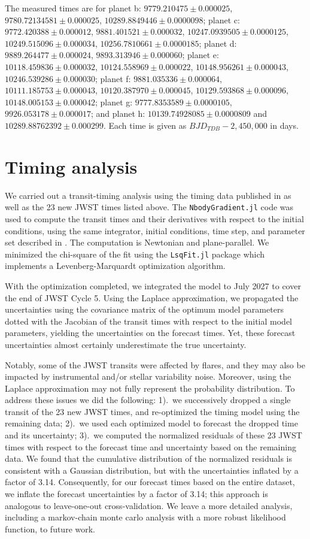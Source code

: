 \documentclass[modern]{aastex631}
\begin{document}
The measured times are for planet b: $9779.210475\pm0.000025$, $9780.72134581\pm 0.000025$, $10289.8849446\pm 0.0000098$;
planet c: $9772.420388\pm 0.000012$, $9881.401521\pm 0.000032$,
$10247.0939505\pm 0.0000125$, $10249.515096\pm 0.000034$, 
$10256.7810661\pm 0.0000185$; planet d: $9889.264477\pm 0.000024$,
$9893.313946\pm 0.000060$;
planet e: $10118.459836\pm 0.000032$, $10124.558969\pm 0.000022$,     
$10148.956261\pm 0.000043$, $10246.539286\pm 0.000030$;
planet f: $9881.035336\pm 0.000064$,
$10111.185753\pm 0.000043$,
$10120.387970\pm 0.000045$,
$10129.593868\pm 0.000096$,
$10148.005153\pm 0.000042$;
planet g:
$9777.8353589\pm 0.0000105$,
$9926.053178\pm 0.000017$; and
planet h: $10139.74928085\pm 0.0000809$ and
$10289.88762392\pm 0.000299$.  Each time is given as $BJD_{TDB}-2,450,000$ in days.

\section{Timing analysis} 

We carried out a transit-timing analysis using the timing data published in
\citet{Agol2021a} as well as the 23 new JWST times listed above. 
The \texttt{NbodyGradient.jl} \citep{Agol2021b} code was used to compute the transit
times and their derivatives with respect to the initial conditions,
using the same integrator, initial conditions, time step, and parameter set described in \citet{Agol2021a}.  The computation
is Newtonian and plane-parallel.  We
minimized the chi-square of the fit using the \texttt{LsqFit.jl} 
package which implements a Levenberg-Marquardt optimization algorithm.

With the optimization completed, we integrated the model to July 2027
to cover the end of JWST Cycle 5.  Using the Laplace approximation, we
propagated the uncertainties using the covariance matrix of the
optimum model parameters dotted with the Jacobian of the transit times
with respect to the initial model parameters, yielding the uncertainties on the forecast times.  Yet, these forecast uncertainties almost certainly underestimate the true uncertainty.

Notably, some of the JWST transits were affected by flares, and they may also be impacted by instrumental and/or stellar variability noise.  Moreover, using the Laplace approximation may not fully represent the probability distribution.  To address these issues we did the following: 1).\ we successively dropped a single transit of the 23 new JWST times, and re-optimized the timing model using the remaining data; 2).\ we used each optimized model to forecast the dropped time and its uncertainty; 3).\ we computed the normalized residuals of these 23 JWST times with respect to the forecast time and uncertainty based on the remaining data.  We found that the cumulative distribution of the normalized residuals is consistent with a Gaussian distribution, but with the uncertainties inflated by a factor of 3.14.  Consequently, for our forecast times based on the entire dataset, we inflate the forecast uncertainties by a factor of 3.14; this approach is analogous to leave-one-out cross-validation.
We leave a more detailed
analysis, including a markov-chain monte carlo analysis with a more
robust likelihood function, to future work.
\end{document}
